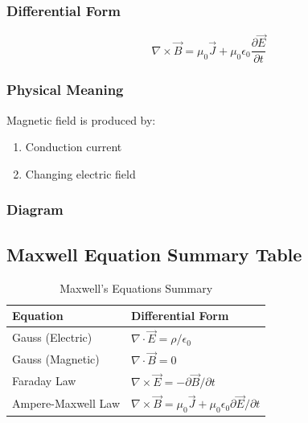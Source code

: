 \documentclass[11pt,a4paper]{article}
\begin{document}
\subsubsection*{Differential Form}
\begin{tcolorbox}[colback=RoyalBlue!5!white, colframe=RoyalBlue]
    \[ \nabla \times \vec{B} = \mu_0\vec{J} + \mu_0\epsilon_0\frac{\partial\vec{E}}{\partial t} \]
\end{tcolorbox}

\subsubsection*{Physical Meaning}
Magnetic field is produced by:
\begin{enumerate}
    \item Conduction current
    \item Changing electric field
\end{enumerate}

\subsubsection*{Diagram}
\begin{center}
\end{center}

\subsection*{Maxwell Equation Summary Table}
\begin{table}[htbp]
    \centering
    \caption{Maxwell's Equations Summary}
    \vspace{0.2cm}
    \begin{tabular}{ll}
        \toprule
        \textbf{Equation} & \textbf{Differential Form} \\
        \midrule
        Gauss (Electric) & \( \nabla\cdot\vec{E}=\rho/\epsilon_0 \) \\
        Gauss (Magnetic) & \( \nabla\cdot\vec{B}=0 \) \\
        Faraday Law & \( \nabla\times\vec{E}=-\partial\vec{B}/\partial t \) \\
        Ampere-Maxwell Law & \( \nabla\times\vec{B}=\mu_0\vec{J}+\mu_0\epsilon_0\partial\vec{E}/\partial t \) \\
        \bottomrule
    \end{tabular}
\end{table}
\end{document}
